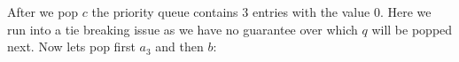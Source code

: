 \begin{center}
\end{center}
After we pop $c$ the priority queue contains 3 entries with the value 0. Here we run into a tie breaking issue as we have no guarantee over which $q$ will be popped next. Now lets pop first $a_3$ and then $b$:

